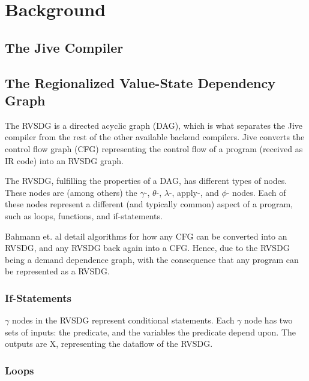 
\section{Background}
\label{background}

\subsection{The Jive Compiler}
\label{background:jive}


\subsection{The Regionalized Value-State Dependency Graph}
\label{background:RVSDG}

The RVSDG is a directed acyclic graph (DAG), which is what separates the Jive
compiler from the rest of the other available backend compilers. Jive converts
the control flow graph (CFG) representing the control flow of a program
(received as IR code) into an RVSDG graph.

The RVSDG, fulfilling the properties of a DAG, has different types of nodes.
These nodes are (among others) the $\gamma$-, $\theta$-, $\lambda$-, apply-, and
$\phi$- nodes. Each of these nodes represent a different (and typically common)
aspect of a program, such as loops, functions, and if-statements.

Bahmann et. al detail algorithms for how any CFG can be
converted into an RVSDG, and any RVSDG back again into a CFG. Hence, due to the
RVSDG being a demand dependence graph, with the consequence that any program can
be represented as a RVSDG.

\subsubsection{If-Statements}

\textit{$\gamma$} nodes in the RVSDG represent conditional statements.
Each $\gamma$ node has two sets of inputs: the predicate, and the
variables the predicate depend upon.
The outputs are X, representing the dataflow of the
RVSDG.

\subsubsection{Loops}

